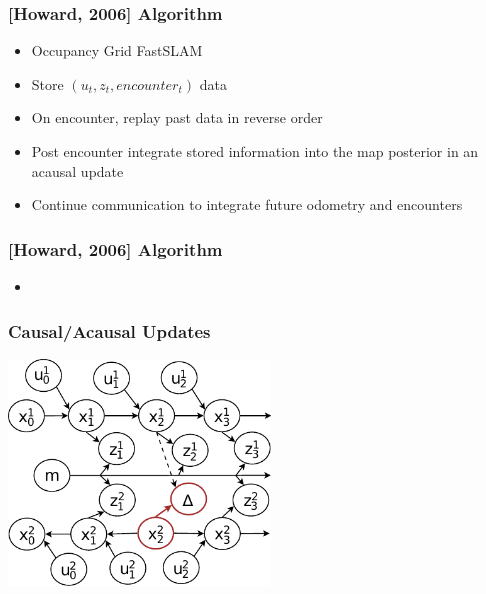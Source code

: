 \begin{frame}
\frametitle{[Howard, 2006] Algorithm}
\begin{itemize}
\item Occupancy Grid FastSLAM 
\item Store $(u_t,z_t,encounter_t)$ data
\item On encounter, replay past data in reverse order
\item Post encounter integrate stored information into the map posterior in an acausal update
\item Continue communication to integrate future odometry and encounters
\end{itemize}
\end{frame}


\begin{frame}
\frametitle{[Howard, 2006] Algorithm}
\begin{itemize}
\item 
\end{itemize}
\end{frame}


\begin{frame}
\frametitle{Causal/Acausal Updates}
\begin{center}
\includegraphics[height=6cm]{../FiguresAndMovies/HowardFig3}
\end{center}
\end{frame}